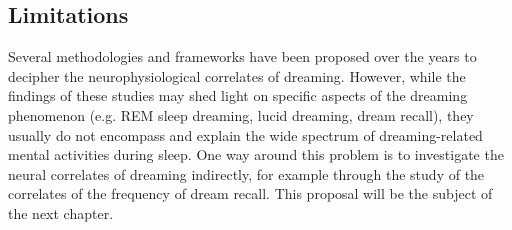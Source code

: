 \subsection{Limitations}
\label{sec:dream-research:attempts:limitations}

Several methodologies and frameworks have been proposed over the years to decipher the neurophysiological correlates of dreaming. However, while the findings of these studies may shed light on specific aspects of the dreaming phenomenon (e.g. REM sleep dreaming, lucid dreaming, dream recall), they usually do not encompass and explain the wide spectrum of dreaming-related mental activities during sleep. One way around this problem is to investigate the neural correlates of dreaming indirectly, for example through the study of the correlates of the frequency of dream recall. This proposal will be the subject of the next chapter.
